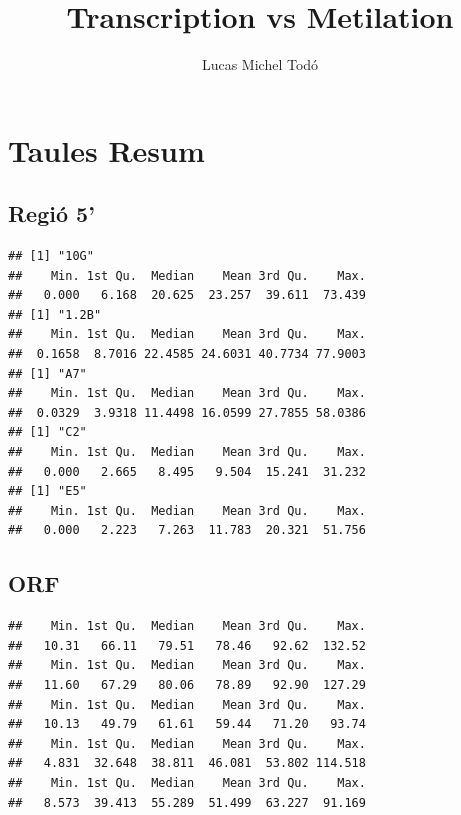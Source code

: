\documentclass{article}\usepackage[]{graphicx}\usepackage[]{color}
\makeatletter
\newenvironment{kframe}{%
 \def\at@end@of@kframe{}%
 \ifinner\ifhmode%
  \def\at@end@of@kframe{\end{minipage}}%
  \begin{minipage}{\columnwidth}%
 \fi\fi%
 \def\FrameCommand##1{\hskip\@totalleftmargin \hskip-\fboxsep
 \colorbox{shadecolor}{##1}\hskip-\fboxsep
     \hskip-\linewidth \hskip-\@totalleftmargin \hskip\columnwidth}%
 \MakeFramed {\advance\hsize-\width
   \@totalleftmargin\z@ \linewidth\hsize
   \@setminipage}}%
 {\par\unskip\endMakeFramed%
 \at@end@of@kframe}
\newenvironment{knitrout}{}{} %
\makeatother
\begin{document}
\title{Transcription vs Metilation}
\author{Lucas Michel Todó}
\maketitle
\tableofcontents
\clearpage





\section{Taules Resum}
\subsection{Regió 5'}
\begin{knitrout}
\color{fgcolor}\begin{kframe}
\begin{verbatim}
## [1] "10G"
##    Min. 1st Qu.  Median    Mean 3rd Qu.    Max. 
##   0.000   6.168  20.625  23.257  39.611  73.439 
## [1] "1.2B"
##    Min. 1st Qu.  Median    Mean 3rd Qu.    Max. 
##  0.1658  8.7016 22.4585 24.6031 40.7734 77.9003 
## [1] "A7"
##    Min. 1st Qu.  Median    Mean 3rd Qu.    Max. 
##  0.0329  3.9318 11.4498 16.0599 27.7855 58.0386 
## [1] "C2"
##    Min. 1st Qu.  Median    Mean 3rd Qu.    Max. 
##   0.000   2.665   8.495   9.504  15.241  31.232 
## [1] "E5"
##    Min. 1st Qu.  Median    Mean 3rd Qu.    Max. 
##   0.000   2.223   7.263  11.783  20.321  51.756
\end{verbatim}
\end{kframe}
\end{knitrout}
\subsection{ORF}
\begin{knitrout}
\color{fgcolor}\begin{kframe}
\begin{verbatim}
##    Min. 1st Qu.  Median    Mean 3rd Qu.    Max. 
##   10.31   66.11   79.51   78.46   92.62  132.52 
##    Min. 1st Qu.  Median    Mean 3rd Qu.    Max. 
##   11.60   67.29   80.06   78.89   92.90  127.29 
##    Min. 1st Qu.  Median    Mean 3rd Qu.    Max. 
##   10.13   49.79   61.61   59.44   71.20   93.74 
##    Min. 1st Qu.  Median    Mean 3rd Qu.    Max. 
##   4.831  32.648  38.811  46.081  53.802 114.518 
##    Min. 1st Qu.  Median    Mean 3rd Qu.    Max. 
##   8.573  39.413  55.289  51.499  63.227  91.169
\end{verbatim}
\end{kframe}
\end{knitrout}
\end{document}
